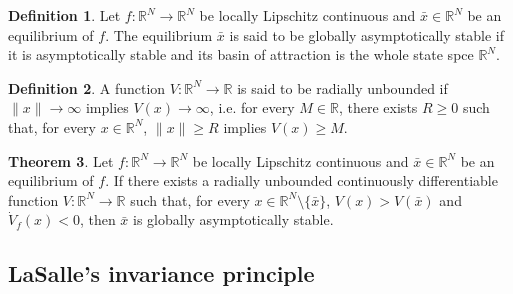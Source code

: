 \documentclass[12pt, openany]{report}
\theoremstyle{definition}
\newtheorem{thm}{Theorem}[chapter]
\newtheorem{definition}[thm]{Definition}
\newcommand{\R}{\mathbb{R}}
\begin{document}
\begin{definition}
    Let \(f:\R^N\rightarrow \R^N\) be locally Lipschitz continuous and \(\bar x\in \R^N\) be an equilibrium of \(f\). The equilibrium \(\bar x\) is said to be globally asymptotically stable if it is asymptotically stable and its basin of attraction is the whole state spce \(\R^N\). 
\end{definition}
\begin{definition}
    A function \(V:\R^N\rightarrow \R\) is said to be radially unbounded if \(\lVert x\rVert \rightarrow \infty\) implies \(V(x)\rightarrow \infty\), i.e. for every \(M\in\R\), there exists \(R\ge 0\) such that, for every \(x\in \R^N\), \(\lVert x\rVert \ge R\) implies \(V(x)\ge M\). 
\end{definition}
\begin{thm}
    Let \(f:\R^N\rightarrow \R^N\) be locally Lipschitz continuous and \(\bar x\in \R^N\) be an equilibrium of \(f\). If there exists a radially unbounded continuously differentiable function \(V:\R^N\rightarrow \R\) such that, for every \(x\in \R^N\setminus \{\bar x\}\), \(V(x)>V(\bar x)\) and \(\dot V_f(x)<0\), then \(\bar x\) is globally asymptotically stable.
\end{thm}
\subsection{LaSalle's invariance principle}
\end{document}
